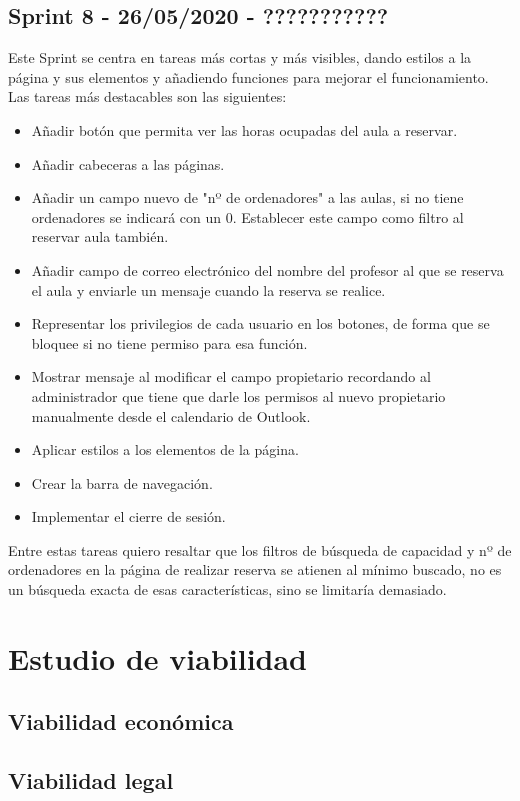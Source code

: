 \subsection{Sprint 8 - 26/05/2020 - ???????????}
Este Sprint se centra en tareas más cortas y más visibles, dando estilos a la página y sus elementos y añadiendo funciones para mejorar el funcionamiento. Las tareas más destacables son las siguientes:
\begin{itemize}
    \item Añadir botón que permita ver las horas ocupadas del aula a reservar.
    \item Añadir cabeceras a las páginas.
    \item Añadir un campo nuevo de "nº de ordenadores" a las aulas, si no tiene ordenadores se indicará con un 0. Establecer este campo como filtro al reservar aula también.
    \item Añadir campo de correo electrónico del nombre del profesor al que se reserva el aula y enviarle un mensaje cuando la reserva se realice.
    \item Representar los privilegios de cada usuario en los botones, de forma que se bloquee si no tiene permiso para esa función.
    \item Mostrar mensaje al modificar el campo propietario recordando al administrador que tiene que darle los permisos al nuevo propietario manualmente desde el calendario de Outlook.
    \item Aplicar estilos a los elementos de la página.
    \item Crear la barra de navegación.
    \item Implementar el cierre de sesión.
\end{itemize}
Entre estas tareas quiero resaltar que los filtros de búsqueda de capacidad y nº de ordenadores en la página de realizar reserva se atienen al mínimo buscado, no es un búsqueda exacta de esas características, sino se limitaría demasiado.

\section{Estudio de viabilidad}

\subsection{Viabilidad económica}

\subsection{Viabilidad legal}




